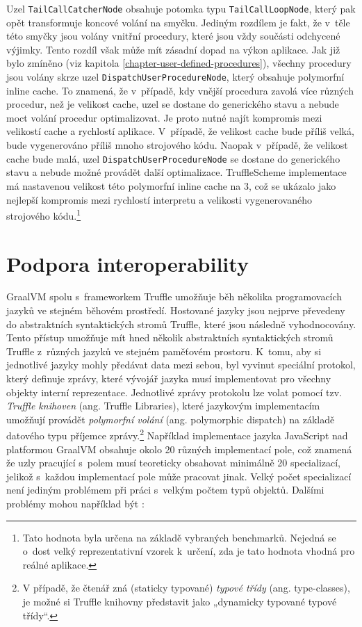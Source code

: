 \documentclass[
  master,
  biblatex,
  figures=true,
  theorems,
  sourcecodes,
  glossaries,
  index
]{kidiplom}
\begin{document}
Uzel \texttt{TailCallCatcherNode}  obsahuje potomka typu \texttt{TailCall\-Loop\-Node}, který pak opět transformuje koncové volání na smyčku. Jediným rozdílem je fakt, že v~těle této smyčky jsou volány vnitřní procedury, které jsou vždy součásti odchycené výjimky. Tento rozdíl však může mít zásadní dopad na výkon aplikace. Jak již bylo zmíněno (viz kapitola \ref{chapter-user-defined-procedures}), všechny procedury jsou volány skrze uzel \texttt{DispatchUserProcedureNode}, který obsahuje polymorfní inline cache. To znamená, že v~případě, kdy vnější procedura zavolá více různých procedur, než je velikost cache, uzel se dostane do generického stavu a nebude moct volání procedur optimalizovat. Je proto nutné najít kompromis mezi velikostí cache a rychlostí aplikace. V~případě, že velikost cache bude příliš velká, bude vygenerováno příliš mnoho strojového kódu. Naopak v~případě, že velikost cache bude malá, uzel \texttt{DispatchUserProcedureNode} se dostane do generického stavu a nebude možné provádět další optimalizace. TruffleScheme implementace má nastavenou velikost této polymorfní inline cache na 3, což se ukázalo jako nejlepší kompromis mezi rychlostí interpretu a velikosti vygenerovaného strojového kódu.\footnote{Tato hodnota byla určena na základě vybraných benchmarků. Nejedná se o~dost velký reprezentativní vzorek k~určení, zda je tato hodnota vhodná pro reálné aplikace.}



\section{Podpora interoperability}
\label{chapter-interoperability-support}
GraalVM spolu s~frameworkem Truffle umožňuje běh několika programovacích jazyků ve stejném běhovém prostředí. Hostované jazyky jsou nejprve převedeny do abstraktních syntaktických stromů Truffle, které jsou následně vyhodnocovány. Tento přístup umožňuje mít hned několik abstraktních syntaktických stromů Truffle z~různých jazyků ve stejném paměťovém prostoru. K~tomu, aby si jednotlivé jazyky mohly předávat data mezi sebou, byl vyvinut speciální protokol, který definuje zprávy, které vývojář jazyka musí implementovat pro všechny objekty interní reprezentace. Jednotlivé zprávy protokolu lze volat pomocí tzv. \textit{Truffle knihoven} (ang. Truffle Libraries), které jazykovým implementacím umožňují provádět \textit{polymorfní volání} (ang. polymorphic dispatch) na základě datového typu příjemce zprávy.\footnote{V případě, že čtenář zná (staticky typované) \textit{typové třídy} (ang. type-classes), je možné si Truffle knihovny představit jako „dynamicky typované typové třídy“.} Například implementace jazyka JavaScript nad platformou GraalVM obsahuje okolo 20 různých implementací pole, což znamená že uzly pracující s~polem musí teoreticky obsahovat minimálně 20 specializací, jelikož s~každou implementací pole může pracovat jinak. Velký počet specializací není jediným problémem při práci s~velkým počtem typů objektů. Dalšími problémy mohou například být \cite{truffle-libraries-guide}:
\end{document}
